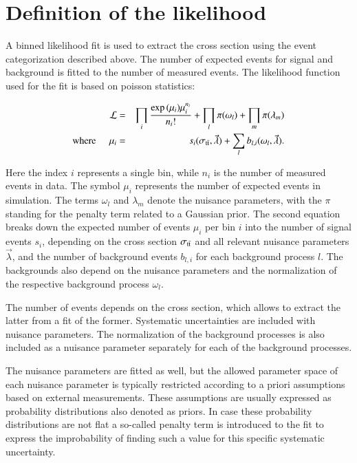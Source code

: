     
\section{Definition of the likelihood}
\label{sec:xsec_stat}

A binned likelihood fit is used to extract the \ttbar cross section using the event categorization described above. 
The number of expected events for signal and background is fitted to the number of measured events. 
The likelihood function used for the fit is based on poisson statistics:

\begin{eqnarray}
   \mathcal{L}  &=& \prod_{i} \frac{\exp{(\mu_i)} \mu_i^{n_i}}{n_i !}  + \prod_{l} \pi(\omega_l) + \prod_{m} \pi(\lambda_m) \\
 \mathrm{where} \; \; \; \; \; \mu_i &=& s_i(\sigma_\mathrm{t\bar{t}},\vec{\lambda}) + \sum_{l} b_{l,i}(\omega_l,\vec{\lambda}).
\label{eq:xsec_chisqfunct}
\end{eqnarray}

Here the index $i$ represents a single bin, while $n_i$ is the number of measured events in data. The symbol $\mu_i$ represents the number
of expected events in simulation. The terms $\omega_l$ and $\lambda_m$
denote the nuisance parameters, with the $\pi$ standing for the penalty term related to a Gaussian prior.
The second equation breaks down the expected number of events $\mu_i$ per bin $i$ into the number of signal events $s_i$, depending on the \ttbar cross section $\sigma_\mathrm{t\bar{t}}$ and all relevant nuisance parameters $\vec{\lambda}$, and the number of
background events  $b_{l,i}$ for each background process $l$. The backgrounds also depend on the nuisance parameters and the normalization of the respective background process $\omega_l$.

The number of \ttbar events depends on the \ttbar cross section, which allows to extract the latter from a fit of the former. Systematic uncertainties are included with nuisance parameters.
The normalization of the background processes is also included as a nuisance parameter separately for each of the background processes.

The nuisance parameters are fitted as well, but the allowed parameter space of each nuisance parameter is typically restricted according
to a priori assumptions based on external measurements. These assumptions are usually expressed as probability distributions also denoted as priors.
In case these probability distributions are not flat a so-called penalty term is introduced to the fit to express the improbability of finding such a value for this specific systematic uncertainty.

